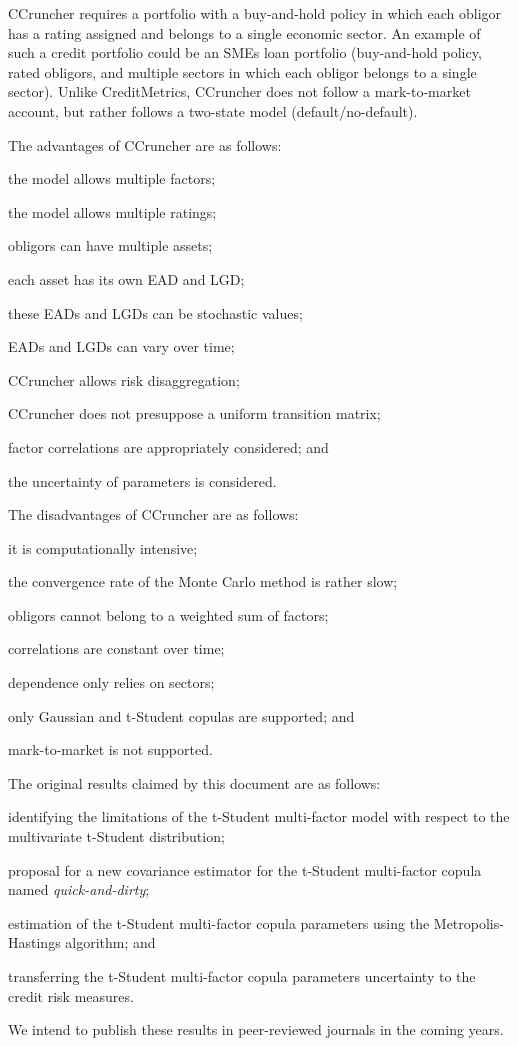 \documentclass[11pt,fleqn]{book} %
\begin{document}
CCruncher requires a portfolio with a buy-and-hold policy in which each obligor 
has a rating assigned and belongs to a single economic sector. An example of 
such a credit portfolio could be an SMEs loan portfolio (buy-and-hold policy, 
rated obligors, and multiple sectors in which each obligor belongs to a single 
sector). Unlike CreditMetrics\texttrademark{}, CCruncher does not follow a 
mark-to-market account, but rather follows a two-state model (default/no-default). 

The advantages of CCruncher are as follows: 
\begin{inparaenum}[1)]
	\item the model allows multiple factors;
	\item the model allows multiple ratings;
	\item obligors can have multiple assets;
	\item each asset has its own EAD and LGD;
	\item these EADs and LGDs can be stochastic values;
	\item EADs and LGDs can vary over time; 
	\item CCruncher allows risk disaggregation;
	\item CCruncher does not presuppose a uniform transition matrix;
	\item factor correlations are appropriately considered; and
	\item the uncertainty of parameters is considered.
\end{inparaenum}

The disadvantages of CCruncher are as follows: 
\begin{inparaenum}[1)]
	\item it is computationally intensive;
	\item the convergence rate of the Monte Carlo method is rather slow;
	\item obligors cannot belong to a weighted sum of factors;
	\item correlations are constant over time;
	\item dependence only relies on sectors;
	\item only Gaussian and t-Student copulas are supported; and
	\item mark-to-market is not supported.
\end{inparaenum}

The original results claimed by this document are as follows: 
\begin{inparaenum}[1)]
	\item identifying the limitations of the t-Student multi-factor model with 
	respect to the multivariate t-Student distribution;
	\item proposal for a new covariance estimator for the t-Student multi-factor 
	copula named \emph{quick-and-dirty};
	\item estimation of the t-Student multi-factor copula parameters using the 
	Metropolis-Hastings algorithm; and
	\item transferring the t-Student multi-factor copula parameters uncertainty 
	to the credit risk measures.
\end{inparaenum}
We intend to publish these results in peer-reviewed journals in the coming 
years.
\end{document}
